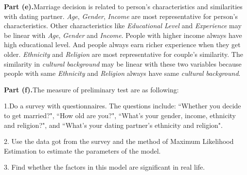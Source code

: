 \documentclass[letterpaper,12pt]{article}
\theoremstyle{definition}
\begin{document}
\textbf{Part (e).}Marriage decision is related to person's characteristics and similarities with dating partner. \emph{Age}, \emph{Gender}, \emph{Income} are most representative for person's characteristics. Other characteristics like \emph{Educational Level} and \emph{Experience}  may be linear with \emph{Age}, \emph{Gender} and \emph{Income}. People with higher income always have high educational level. And people always earn richer experience when they get older. \emph{Ethnicity} and \emph{Religion} are most representative for couple's similarity. The similarity in \emph{cultural background} may be linear with these two variables because people with same \emph{Ethnicity} and \emph{Religion} always have same \emph{cultural background}. 

\textbf{Part (f).}The measure  of preliminary test are as following:

 1.Do a survey with questionnaires. The questions include: ``Whether you decide to get married?", ``How old are you?", ``What's your gender, income, ethnicity and religion?", and ``What's your dating partner's ethnicity and religion".
 
2. Use the data got from the survey and the method of Maximum Likelihood Estimation to estimate the parameters of the model.

3. Find whether the factors in this model are significant in real life. 
\end{document}
